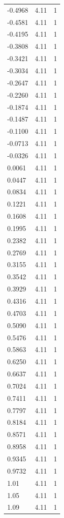 \begin{longtable}{lrr}
  -0.4968 & 4.11 & 1 \\
  -0.4581 & 4.11 & 1 \\
  -0.4195 & 4.11 & 1 \\
  -0.3808 & 4.11 & 1 \\
  -0.3421 & 4.11 & 1 \\
  -0.3034 & 4.11 & 1 \\
  -0.2647 & 4.11 & 1 \\
  -0.2260 & 4.11 & 1 \\
  -0.1874 & 4.11 & 1 \\
  -0.1487 & 4.11 & 1 \\
  -0.1100 & 4.11 & 1 \\
  -0.0713 & 4.11 & 1 \\
  -0.0326 & 4.11 & 1 \\
  0.0061 & 4.11 & 1 \\
  0.0447 & 4.11 & 1 \\
  0.0834 & 4.11 & 1 \\
  0.1221 & 4.11 & 1 \\
  0.1608 & 4.11 & 1 \\
  0.1995 & 4.11 & 1 \\
  0.2382 & 4.11 & 1 \\
  0.2769 & 4.11 & 1 \\
  0.3155 & 4.11 & 1 \\
  0.3542 & 4.11 & 1 \\
  0.3929 & 4.11 & 1 \\
  0.4316 & 4.11 & 1 \\
  0.4703 & 4.11 & 1 \\
  0.5090 & 4.11 & 1 \\
  0.5476 & 4.11 & 1 \\
  0.5863 & 4.11 & 1 \\
  0.6250 & 4.11 & 1 \\
  0.6637 & 4.11 & 1 \\
  0.7024 & 4.11 & 1 \\
  0.7411 & 4.11 & 1 \\
  0.7797 & 4.11 & 1 \\
  0.8184 & 4.11 & 1 \\
  0.8571 & 4.11 & 1 \\
  0.8958 & 4.11 & 1 \\
  0.9345 & 4.11 & 1 \\
  0.9732 & 4.11 & 1 \\
  1.01 & 4.11 & 1 \\
  1.05 & 4.11 & 1 \\
  1.09 & 4.11 & 1 \\

\end{longtable}
